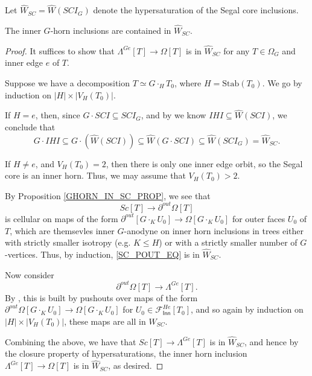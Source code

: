 \documentclass[a4paper,10p,draft]{article}%
\numberwithin{equation}{section}%
\begin{document}
\begin{definition}
      Let $\hat{W}_{SC} = \hat{W}(SCI_G)$ denote the hypersaturation of the Segal core inclusions.
\end{definition}

\begin{lemma}
      \label{GHORN_IN_SC_PROP}
      The inner $G$-horn inclusions are contained in $\hat{W}_{SC}$.
\end{lemma}
\begin{proof}
      It suffices to show that $\Lambda^{G e}[T] \to \Omega[T]$ is in $\hat{W}_{SC}$
      for any $T\in \Omega_G$ and inner edge $e$ of $T$.

      Suppose we have a decomposition $T \simeq G \cdot_H T_0$, where $H = \mathrm{Stab}(T_0)$.
      We go by induction on $|H| \times |V_H(T_0)|$.

      If $H = e$, then, since $G \cdot SCI \subseteq SCI_G$,
      and by \cite[2.5]{CM13a} we know $IHI \subseteq \hat{W}(SCI)$, we conclude that
      \begin{equation}
            G \cdot IHI \subseteq G \cdot (\hat{W}(SCI)) \subseteq \hat{W}(G \cdot SCI) \subseteq \hat{W}(SCI_G) = \hat{W}_{SC}.
      \end{equation}
      
      If $H \neq e$, and $V_H(T_0) = 2$, then there is only one inner edge orbit, so
      the Segal core is an inner horn.
      Thus, we may assume that $V_H(T_0) > 2$.

      By Proposition \ref{GHORN_IN_SC_PROP}, we see that
      \begin{equation}
            \label{SC_POUT_EQ}
            Sc[T] \to \partial^{out}\Omega[T]
      \end{equation}
      is cellular on maps of the form
      $\partial^{out}[G \cdot_K U_0] \to \Omega[G \cdot_K U_0]$ for outer faces $U_0$ of $T$,
      which are themsevles inner $G$-anodyne on inner horn inclusions in trees either
      with strictly smaller isotropy (e.g. $K \leq H$) or
      with a strictly smaller number of $G$-vertices.
      Thus, by induction, \eqref{SC_POUT_EQ} is in $\hat{W}_{SC}$. 

      Now consider
      \begin{equation}
            \label{POUT_GHORN_EQ}
            \partial^{out}\Omega[T] \to \Lambda^{G e}[T].
      \end{equation}
      By \cite[Proposition 6.17]{Per17},
      this is built by pushouts over maps of the form
      $\partial^{out}\Omega[G \cdot_K U_0] \to \Omega[G \cdot_K U_0]$ for $U_0 \in \mathscr{F}_{\mathsf{Inn}}^{H e}[T_0]$,
      and so again by induction on $|H| \times |V_H(T_0)|$, these maps are all in $\hat{W}_{SC}$. 
      
      Combining the above, we have that $Sc[T] \to \Lambda^{G e}[T]$ is in $\hat{W}_{SC}$, and hence
      by the closure property of hypersaturations, the inner horn inclusion $\Lambda^{G e}[T] \to \Omega[T]$
      is in $\hat{W}_{SC}$, as desired.
\end{proof}
\end{document}
